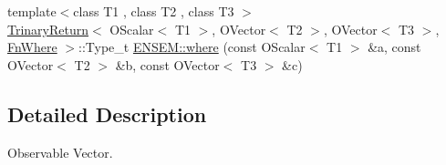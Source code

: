 \begin{DoxyCompactItemize}
\item 
{\footnotesize template$<$class T1 , class T2 , class T3 $>$ }\\\mbox{\hyperlink{structTrinaryReturn}{Trinary\+Return}}$<$ O\+Scalar$<$ T1 $>$, O\+Vector$<$ T2 $>$, O\+Vector$<$ T3 $>$, \mbox{\hyperlink{structFnWhere}{Fn\+Where}} $>$\+::Type\+\_\+t \mbox{\hyperlink{group__obsvector_ga0995058bdfadea43373e7142180780a1}{E\+N\+S\+E\+M\+::where}} (const O\+Scalar$<$ T1 $>$ \&a, const O\+Vector$<$ T2 $>$ \&b, const O\+Vector$<$ T3 $>$ \&c)
\end{DoxyCompactItemize}


\subsection{Detailed Description}
Observable Vector. 

